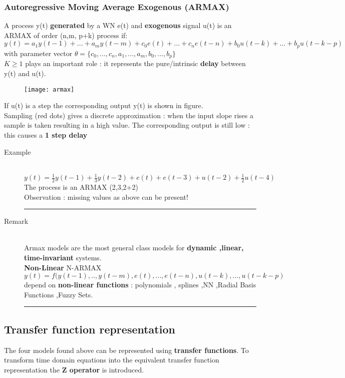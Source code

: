 \subsubsection{Autoregressive Moving Average Exogenous (ARMAX)}
A process y(t) \textbf{generated} by a WN e(t) and \textbf{exogenous} signal u(t) is an ARMAX of order (n,m, p+k) process if:
$$ y(t) = a_1y(t-1)+...+a_my(t-m)+ c_0e(t)+...+c_ne(t-n)+ b_0u(t-k)+...+b_pu(t-k-p)$$ 
with parameter vector $ \theta = \{c_0 ,...,c_n,a_1,...,a_m,b_0,...,b_p\}$\\
$ K \geq 1$ plays an important role : it represents the pure/intrinsic \textbf{delay} between y(t) and u(t).
\begin{figure}[!h]
  \centering
  \texttt{[image: armax]}
\end{figure}
If u(t) is a step the corresponding output y(t) is shown in figure.\\
Sampling (red dots) gives a discrete approximation : when the input slope rises a sample is taken resulting in a high value. The corresponding output is still low : this causes a \textbf{1 step delay}
\begin{description}
\item[Example]\hfill\\
$ y(t)=\frac{1}{2}y(t-1)+\frac{1}{3}y(t-2)+e(t)+e(t-3)+u(t-2)+\frac{1}{2}u(t-4) $
The process is an ARMAX (2,3,2+2)\\
Observation : missing values as above can be present!
\newpage
\par\noindent\rule{\textwidth}{0.4pt}
\item[Remark]\hfill\\
Armax models are the most general class models for \textbf{dynamic ,linear, time-invariant} systems.\\
\textbf{Non-Linear} N-ARMAX $ y(t) = f(y(t-1),..,y(t-m),e(t),...,e(t-n),u(t-k),...,u(t-k-p)$ \\ depend on \textbf{non-linear functions} : polynomials , splines ,NN ,Radial Basis Functions ,Fuzzy Sets.
\par\noindent\rule{\textwidth}{0.4pt}
\end{description}


\subsection{Transfer function representation}
The four models found above can be represented using \textbf{transfer functions}.
To transform time domain equations into the equivalent transfer function representation the \textbf{Z operator} is introduced.
